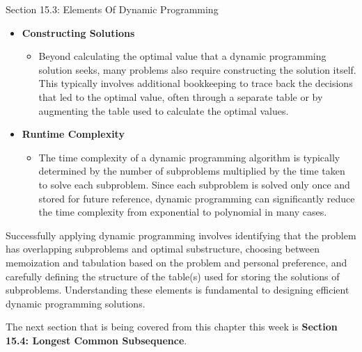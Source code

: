 \begin{notes}{Section 15.3: Elements Of Dynamic Programming}
\begin{itemize}
        \item \textbf{Constructing Solutions}
        \begin{itemize}
            \item Beyond calculating the optimal value that a dynamic programming solution seeks, many problems also require constructing the solution itself. This typically involves additional 
            bookkeeping to trace back the decisions that led to the optimal value, often through a separate table or by augmenting the table used to calculate the optimal values.
        \end{itemize}
        
        \item \textbf{Runtime Complexity}
        \begin{itemize}
            \item The time complexity of a dynamic programming algorithm is typically determined by the number of subproblems multiplied by the time taken to solve each subproblem. Since each subproblem 
            is solved only once and stored for future reference, dynamic programming can significantly reduce the time complexity from exponential to polynomial in many cases.
        \end{itemize}
    \end{itemize}
    
    \begin{highlight}
        Successfully applying dynamic programming involves identifying that the problem has overlapping subproblems and optimal substructure, choosing between memoization and tabulation based on the 
        problem and personal preference, and carefully defining the structure of the table(s) used for storing the solutions of subproblems. Understanding these elements is fundamental to designing 
        efficient dynamic programming solutions.
    \end{highlight}    
\end{notes}

The next section that is being covered from this chapter this week is \textbf{Section 15.4: Longest Common Subsequence}.

